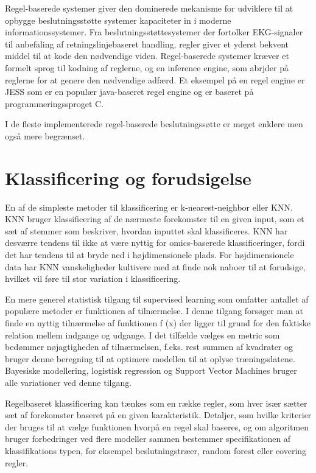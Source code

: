 Regel-baserede systemer giver den dominerede mekanisme for udviklere til at opbygge beslutningsstøtte systemer kapaciteter in i moderne informationssystemer. Fra beslutningsstøttesystemer der fortolker EKG-signaler til anbefaling af retningslinjebaseret handling, regler giver et yderst bekvent middel til at kode den nødvendige viden. 
Regel-baserede systemer kræver et formelt sprog til kodning af reglerne, og en inference engine, som abrjder på reglerne for at genere den nødvendige adfærd. Et eksempel på en regel engine er JESS som er en populær java-baseret regel engine og er baseret på programmeringssproget C. 

I de fleste implementerede regel-baserede beslutningssøtte er meget enklere men også mere begrænset. 

\section{Klassificering og forudsigelse}
En af de simpleste metoder til klassificering er k-nearest-neighbor eller KNN. KNN bruger klassificering af de nærmeste forekomster til en given input, som et sæt af stemmer som beskriver, hvordan inputtet skal klassificeres.
KNN har desværre tendens til ikke at være nyttig for omics-baserede klassificeringer, fordi det har tendens til at bryde ned i højdimensionele plads. For højdimensionele data har KNN vanskeligheder kultivere med at finde nok naboer til at forudsige, hvilket vil føre til stor variation i klassificering. 

En mere generel statistisk tilgang til supervised learning
som omfatter antallet af populære metoder er funktionen af tilnærmelse. I denne tilgang forsøger man at
finde en nyttig tilnærmelse af funktionen f (x)
der ligger til grund for den faktiske relation mellem
indgange og udgange. I det tilfælde vælges en metric som bedømmer nøjagtigheden af tilnærmelsen, f.eks. rest summen af kvadrater og bruger denne beregning til at optimere modellen til at oplyse træningsdatene. Bayesiske modellering, logistisk regression og Support Vector Machines bruger alle variationer ved denne tilgang.

Regelbaseret klassificering kan tænkes som
en række regler, som hver især sætter sæt af
forekomster baseret på en given karakteristik. Detaljer,
som hvilke kriterier der bruges til at vælge funktionen
hvorpå en regel skal baseres, og om
algoritmen bruger forbedringer ved flere modeller sammen bestemmer specifikationen af klassifikations typen, for eksempel beslutningstræer, random forest eller covering
regler.

